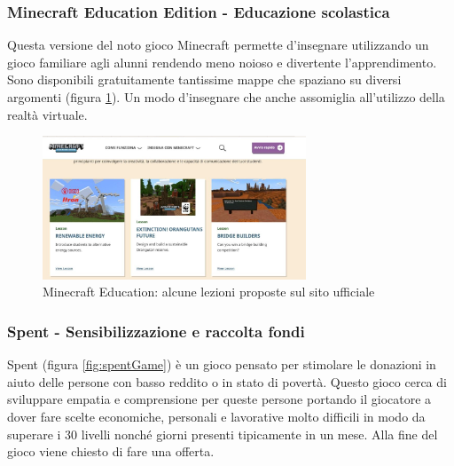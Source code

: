 \subsubsection{Minecraft Education Edition - Educazione scolastica}
Questa versione del noto gioco Minecraft \cite{minecraftEdu} permette d'insegnare utilizzando un gioco familiare agli alunni rendendo meno noioso e divertente l'apprendimento. Sono disponibili gratuitamente tantissime mappe che spaziano su diversi argomenti (figura \ref{fig:minecraftEdu}). Un modo d'insegnare che anche assomiglia all'utilizzo della realtà virtuale.

\begin{figure} [h!]
    \center
    \includegraphics[width=0.70\textwidth]{img/minecraft-lessons.jpg}
    \caption{Minecraft Education: alcune lezioni proposte sul sito ufficiale \cite{minecraftEdu}}
    \label{fig:minecraftEdu}
\end{figure}

\subsubsection{Spent - Sensibilizzazione e raccolta fondi}
Spent \cite{spentGame} (figura \ref{fig:spentGame}) è un gioco pensato per stimolare le donazioni in aiuto delle persone con basso reddito o in stato di povertà. Questo gioco cerca di  sviluppare empatia e comprensione per queste persone portando il giocatore a dover fare scelte economiche, personali e lavorative molto difficili in modo da superare i 30 livelli nonché giorni presenti tipicamente in un mese.
Alla fine del gioco viene chiesto di fare una offerta.

